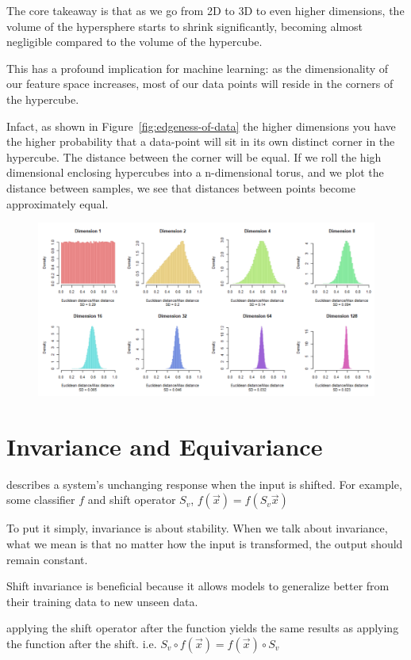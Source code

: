 \documentclass[11pt]{article}
\begin{document}
The core takeaway is that as we go from 2D to 3D to even higher dimensions, the volume of the hypersphere starts to shrink significantly, becoming almost negligible compared to the volume of the hypercube.

This has a profound implication for machine learning: as the dimensionality of our feature space increases, most of our data points will reside in the corners of the hypercube.

Infact, as shown in Figure~\ref{fig:edgeness-of-data} the higher dimensions you have the higher probability that a data-point will sit in its own distinct corner in the hypercube. The distance between the corner will be equal. If we roll the high dimensional enclosing hypercubes into a n-dimensional torus, and we plot the distance between samples, we see that distances between points become approximately equal.

\begin{figure}[H]
    \centering
    \includegraphics[width=.6\textwidth]{figures/distnace-between-points.png}
\end{figure}

\section{Invariance and Equivariance}

\begin{definition}\label{def:shift-invariance}
    describes a system's unchanging response when the input is shifted. For example, some classifier $f$ and shift operator $S_v$, $f(\vec{x})=f(S_v\vec{x})$
\end{definition}

To put it simply, invariance is about stability. When we talk about invariance, what we mean is that no matter how the input is transformed, the output should remain constant.

Shift invariance is beneficial because it allows models to generalize better from their training data to new unseen data.

\begin{definition}\label{def:shift-equivariance}
    applying the shift operator after the function yields the same results as applying the function after the shift. i.e. $S_v \circ f(\vec{x}) = f(\vec{x}) \circ S_v$
\end{definition}
\end{document}
